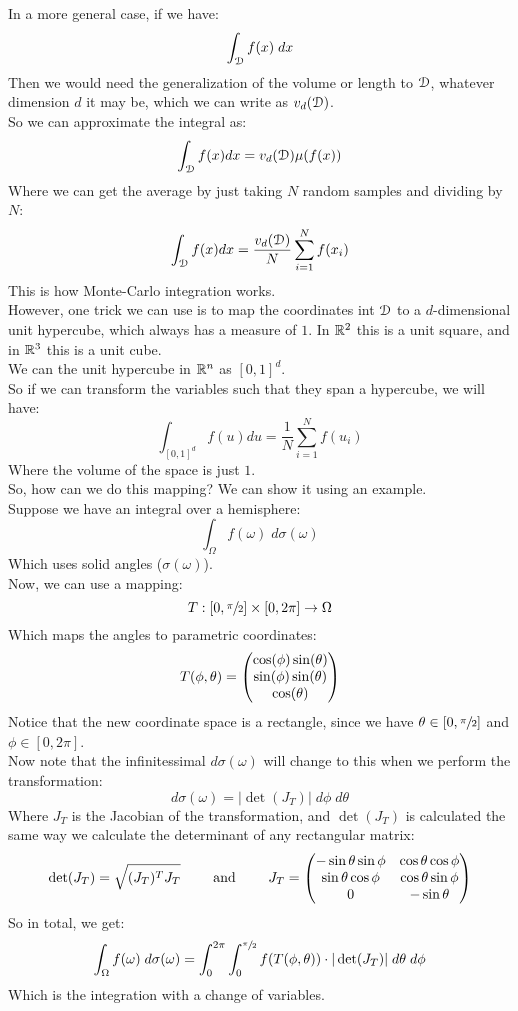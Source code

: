 \documentclass[12pt]{article}
\begin{document}
In a more general case, if we have:
\[ \int_{\mathcal{D}} f(x) \; dx \]
Then we would need the generalization
of the volume or length to $\mathcal{D}$,
whatever dimension $d$ it may be,
which we can write as $v_d(\mathcal{D})$. \\
So we can approximate the integral as:
\[ \int_{\mathcal{D}} f(x) dx
= v_d(\mathcal{D})\mu(f(x)) \]
Where we can get the average by just taking
$N$ random samples and dividing by $N$:
\[ \int_{\mathcal{D}} f(x) dx
= \dfrac{v_d(\mathcal{D})}{N} \sum_{i=1}^N f(x_i) \]
This is how Monte-Carlo integration works. \\

However, one trick we can use
is to map the coordinates int $\mathcal{D}$
to a $d$-dimensional unit hypercube,
which always has a measure of $1$.
In $\mathbb{R}^2$ this is a unit square,
and in $\mathbb{R}^3$ this is a unit cube. \\
We can the unit hypercube in $\mathbb{R}^n$ 
as $[0, 1]^d$. \\
So if we can transform the variables
such that they span a hypercube,
we will have:
\[ \int_{[0, 1]^d} f(u) du
= \dfrac{1}{N} \sum_{i=1}^N f(u_i)  \]
Where the volume of the space is just $1$. \\

So, how can we do this mapping?
We can show it using an example. \\
Suppose we have an integral over a hemisphere:
\[ \int_\Omega f(\omega) \; d\sigma(\omega) \]
Which uses solid angles ($\sigma(\omega)$). \\
Now, we can use a mapping:
\[ T: [0, \sfrac{\pi}{2}] \times [0, 2\pi] \to \Omega \]
Which maps the angles to parametric coordinates:
\[ T(\phi, \theta) = \begin{pmatrix} 
    \cos(\phi)\sin(\theta) \\
    \sin(\phi)\sin(\theta) \\
    \cos(\theta)
 \end{pmatrix} \]
Notice that the new coordinate space is a rectangle,
since we have $\theta \in [0, \sfrac{\pi}{2}]$
and $\phi \in [0, 2\pi]$. \\
Now note that the infinitessimal $d\sigma(\omega)$
will change to this when we perform the transformation:
\[ d\sigma(\omega) = |\det(J_T)| \; d\phi \; d\theta \]
Where $J_T$ is the Jacobian of the transformation,
and $\det(J_T)$ is calculated the same way
we calculate the determinant of any rectangular
matrix:
\[ \det(J_T) = \sqrt{(J_T)^TJ_T}
\qquad \text{ and } \qquad J_T = \begin{pmatrix} 
-\sin\theta \sin\phi & \cos\theta \cos\phi  \\
\sin\theta \cos\phi  & \cos\theta \sin\phi\\
0 & -\sin\theta  \end{pmatrix} \]
So in total, we get:
\[ \int_\Omega f(\omega) \; d\sigma(\omega)
= \int_0^{2\pi} \int_0^{\sfrac{\pi}{2}} 
f(T(\phi, \theta)) \cdot |\det(J_T)| 
\; d\theta \; d\phi\]
Which is the integration with a change
of variables. \\
\end{document}
